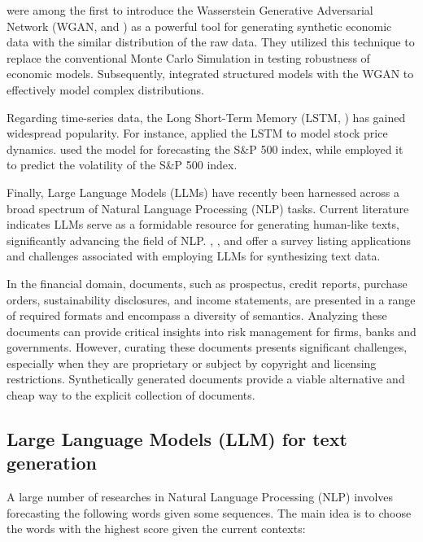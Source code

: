 \cite{athey2021using} were among the first to introduce the Wasserstein Generative Adversarial Network (WGAN, \cite{arjovsky2017wasserstein} and \cite{goodfellow2020generative}) as a powerful tool for generating synthetic economic data with the similar distribution of the raw data. They utilized this technique to replace the conventional Monte Carlo Simulation in testing robustness of economic models. Subsequently, \cite{kaji2023adversarial} integrated structured models with the WGAN to effectively model complex distributions.  

Regarding time-series data, the Long Short-Term Memory (LSTM, \cite{hochreiter1997long}) has gained widespread popularity. For instance, \cite{carvajal2022synthetic} applied the LSTM to model stock price dynamics. \cite{fischer2018deep} used the model for forecasting the S\&P 500 index, while \cite{liu2019novel} employed it to predict the volatility of the S\&P 500 index. 

Finally, Large Language Models (LLMs) have recently been harnessed across a broad spectrum of Natural Language Processing (NLP) tasks. Current literature indicates LLMs serve as a formidable resource for generating human-like texts, significantly advancing the field of NLP. \cite{potluru2023synthetic}, \cite{assefa2020generating}, and \cite{guo2024generative} offer a survey listing applications and challenges associated with employing LLMs for synthesizing text data. 

In the financial domain, documents, such as prospectus, credit reports, purchase orders, sustainability disclosures, and income statements, are presented in a range of required formats and encompass a diversity of semantics. Analyzing these documents can provide critical insights into risk management for firms, banks and governments. However, curating these documents presents significant challenges, especially when they are proprietary or subject by copyright and licensing restrictions. Synthetically generated documents provide a viable alternative and cheap way to the explicit collection of documents.


\subsection{Large Language Models (LLM) for text generation}\label{ch2:sec:lr:llm}
A large number of researches in Natural Language Processing (NLP) involves forecasting the following words given some sequences. The main idea is to choose the words with the highest score given the current contexts:


